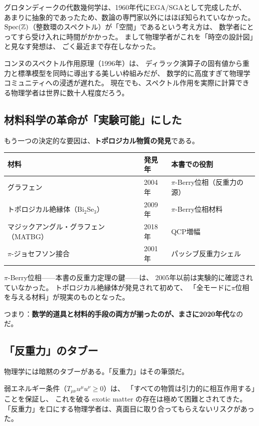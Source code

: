 グロタンディークの代数幾何学は、1960年代にEGA/SGAとして完成したが、
あまりに抽象的であったため、数論の専門家以外にはほぼ知られていなかった。
$\operatorname{Spec}(\mathbb{Z})$（整数環のスペクトル）が「空間」であるという考え方は、
数学者にとってすら受け入れに時間がかかった。
まして物理学者がこれを「時空の設計図」と見なす発想は、
ごく最近まで存在しなかった。

コンヌのスペクトル作用原理（1996年）は、
ディラック演算子の固有値から重力と標準模型を同時に導出する美しい枠組みだが、
数学的に高度すぎて物理学コミュニティへの浸透が遅れた。
現在でも、スペクトル作用を実際に計算できる物理学者は世界に数十人程度だろう。

\subsection*{材料科学の革命が「実験可能」にした}

もう一つの決定的な要因は、\textbf{トポロジカル物質の発見}である。

\begin{center}
\begin{tabular}{lll}
\toprule
材料 & 発見年 & 本書での役割 \\
\midrule
グラフェン & 2004年 & $\pi$-Berry位相（反重力の源） \\
トポロジカル絶縁体（Bi$_2$Se$_3$） & 2009年 & $\pi$-Berry位相材料 \\
マジックアングル・グラフェン（MATBG） & 2018年 & QCP増幅 \\
$\pi$-ジョセフソン接合 & 2001年 & パッシブ反重力シェル \\
\bottomrule
\end{tabular}
\end{center}

$\pi$-Berry位相——本書の反重力定理の鍵——は、
2005年以前は実験的に確認されていなかった。
トポロジカル絶縁体が発見されて初めて、
「全モードに$\pi$位相を与える材料」が現実のものとなった。

つまり：\textbf{数学的道具と材料的手段の両方が揃ったのが、まさに2020年代}なのだ。

\subsection*{「反重力」のタブー}

物理学には暗黙のタブーがある。「反重力」はその筆頭だ。

弱エネルギー条件（$T_{\mu\nu} u^\mu u^\nu \geq 0$）は、
「すべての物質は引力的に相互作用する」ことを保証し、
これを破る exotic matter の存在は極めて困難とされてきた。
「反重力」を口にする物理学者は、真面目に取り合ってもらえないリスクがあった。

